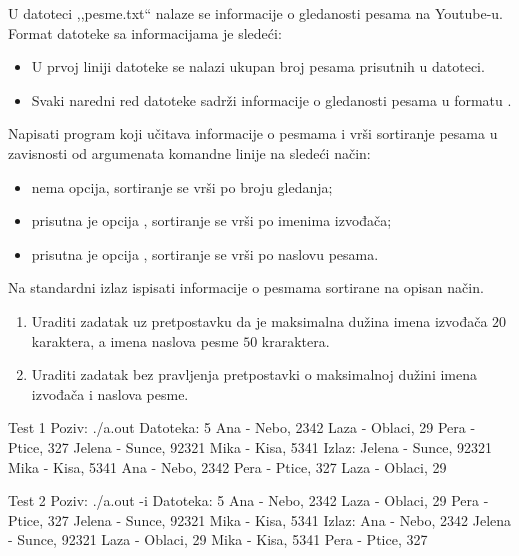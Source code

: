\begin{Exercise}[label=333]
U datoteci ,,pesme.txt`` nalaze se informacije o gledanosti pesama
na Youtube-u. Format datoteke sa informacijama je sledeći:
\begin{itemize}
\item U prvoj liniji datoteke se nalazi ukupan broj pesama prisutnih u datoteci.
\item Svaki naredni red datoteke sadrži informacije o 
gledanosti pesama u formatu . 
\end{itemize}
Napisati program koji učitava informacije o pesmama i vrši 
sortiranje pesama u zavisnosti od argumenata komandne linije na sledeći način:
\begin{itemize}
\item nema opcija, sortiranje se vrši po broju gledanja;
\item prisutna je opcija , sortiranje se vrši po imenima izvođača;
\item prisutna je opcija , sortiranje se vrši po naslovu pesama.
\end{itemize}
Na standardni izlaz ispisati informacije o pesmama sortirane na opisan način.
\begin{enumerate}
\item Uraditi zadatak uz pretpostavku da 
je maksimalna dužina imena izvođača $20$ karaktera, a imena naslova pesme $50$ kraraktera.
\item Uraditi zadatak bez pravljenja pretpostavki o maksimalnoj dužini imena izvođača i naslova pesme.
\end{enumerate}

\begin{miditest}
\begin{test}{Test 1}
Poziv: ./a.out
Datoteka:  5
           Ana - Nebo, 2342
           Laza - Oblaci, 29
           Pera - Ptice, 327
           Jelena - Sunce, 92321
           Mika - Kisa, 5341
Izlaz:     Jelena - Sunce, 92321
           Mika - Kisa, 5341
           Ana - Nebo, 2342
           Pera - Ptice, 327
           Laza - Oblaci, 29
\end{test}
\end{miditest}
\begin{miditest}
\begin{test}{Test 2}
Poziv: ./a.out -i
Datoteka:  5
           Ana - Nebo, 2342
           Laza - Oblaci, 29
           Pera - Ptice, 327
           Jelena - Sunce, 92321
           Mika - Kisa, 5341
Izlaz:     Ana - Nebo, 2342
           Jelena - Sunce, 92321
           Laza - Oblaci, 29
           Mika - Kisa, 5341
           Pera - Ptice, 327
\end{test}
\end{miditest}


\end{Exercise}
